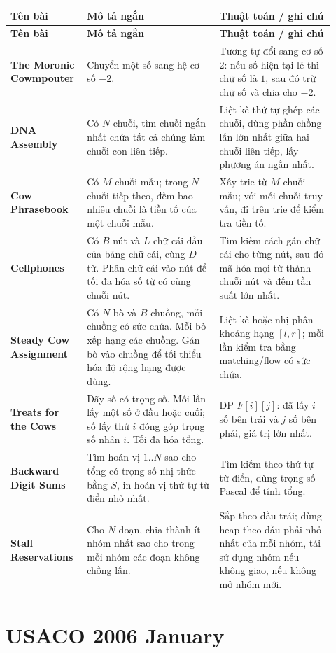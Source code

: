 \documentclass[11pt]{article}
\newenvironment{solutiontable}{%
  \small
  \setlength{\tabcolsep}{4pt}
  \renewcommand{\arraystretch}{1.14}
  \begin{longtable}{L{0.19\linewidth}L{0.39\linewidth}L{0.34\linewidth}}
  \toprule
  \textbf{Tên bài} & \textbf{Mô tả ngắn} & \textbf{Thuật toán / ghi chú}\\
  \midrule
  \endfirsthead
  \toprule
  \textbf{Tên bài} & \textbf{Mô tả ngắn} & \textbf{Thuật toán / ghi chú}\\
  \midrule
  \endhead
}{%
  \bottomrule
  \end{longtable}
  \normalsize
}
\newcommand{\problemrow}[3]{\textbf{#1} & #2 & #3\\\midrule}
\begin{document}
\begin{solutiontable}
\problemrow{The Moronic Cowmpouter}{Chuyển một số sang hệ cơ số \(-2\).}{Tương tự đổi sang cơ số \(2\): nếu số hiện tại lẻ thì chữ số là \(1\), sau đó trừ chữ số và chia cho \(-2\).}
\problemrow{DNA Assembly}{Có \(N\) chuỗi, tìm chuỗi ngắn nhất chứa tất cả chúng làm chuỗi con liên tiếp.}{Liệt kê thứ tự ghép các chuỗi, dùng phần chồng lấn lớn nhất giữa hai chuỗi liên tiếp, lấy phương án ngắn nhất.}
\problemrow{Cow Phrasebook}{Có \(M\) chuỗi mẫu; trong \(N\) chuỗi tiếp theo, đếm bao nhiêu chuỗi là tiền tố của một chuỗi mẫu.}{Xây trie từ \(M\) chuỗi mẫu; với mỗi chuỗi truy vấn, đi trên trie để kiểm tra tiền tố.}
\problemrow{Cellphones}{Có \(B\) nút và \(L\) chữ cái đầu của bảng chữ cái, cùng \(D\) từ. Phân chữ cái vào nút để tối đa hóa số từ có cùng chuỗi nút.}{Tìm kiếm cách gán chữ cái cho từng nút, sau đó mã hóa mọi từ thành chuỗi nút và đếm tần suất lớn nhất.}
\problemrow{Steady Cow Assignment}{Có \(N\) bò và \(B\) chuồng, mỗi chuồng có sức chứa. Mỗi bò xếp hạng các chuồng. Gán bò vào chuồng để tối thiểu hóa độ rộng hạng được dùng.}{Liệt kê hoặc nhị phân khoảng hạng \([l,r]\); mỗi lần kiểm tra bằng matching/flow có sức chứa.}
\problemrow{Treats for the Cows}{Dãy số có trọng số. Mỗi lần lấy một số ở đầu hoặc cuối; số lấy thứ \(i\) đóng góp trọng số nhân \(i\). Tối đa hóa tổng.}{DP \(F[i][j]\): đã lấy \(i\) số bên trái và \(j\) số bên phải, giá trị lớn nhất.}
\problemrow{Backward Digit Sums}{Tìm hoán vị \(1..N\) sao cho tổng có trọng số nhị thức bằng \(S\), in hoán vị thứ tự từ điển nhỏ nhất.}{Tìm kiếm theo thứ tự từ điển, dùng trọng số Pascal để tính tổng.}
\problemrow{Stall Reservations}{Cho \(N\) đoạn, chia thành ít nhóm nhất sao cho trong mỗi nhóm các đoạn không chồng lấn.}{Sắp theo đầu trái; dùng heap theo đầu phải nhỏ nhất của mỗi nhóm, tái sử dụng nhóm nếu không giao, nếu không mở nhóm mới.}
\end{solutiontable}

\section{USACO 2006 January}
\end{document}
